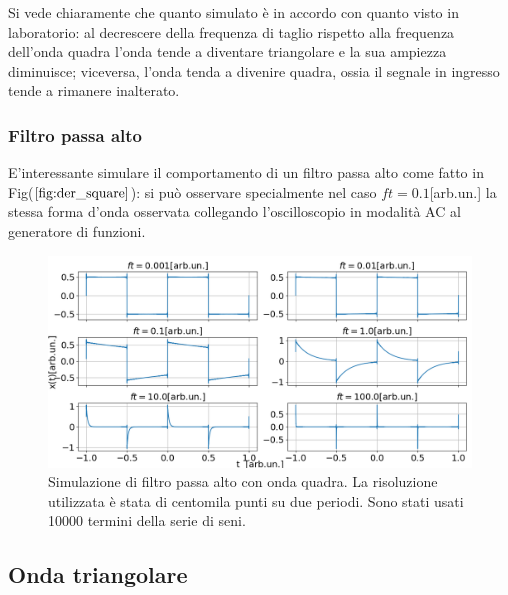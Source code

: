 \documentclass{article}
\begin{document}
                Si vede chiaramente che quanto simulato è in accordo con quanto
                visto in laboratorio: 
                al decrescere della frequenza di taglio rispetto alla frequenza dell'onda quadra
                l'onda tende a diventare triangolare e la sua ampiezza diminuisce; viceversa,
                l'onda tenda a divenire quadra, ossia il segnale in ingresso tende a 
                rimanere inalterato.
            
            
            \subsubsection{Filtro passa alto}
                E'interessante simulare il comportamento di un filtro passa alto 
                come fatto in Fig($\ref{fig:der_square}$): si  può osservare specialmente 
                nel caso $ft=0.1$[arb.un.] la stessa forma d'onda osservata collegando 
                l'oscilloscopio in modalità AC al generatore di funzioni.
                    \begin{figure}[H]
                        \centering
                        \includegraphics[width=1\textwidth]{der_square.png} %
                        \caption{Simulazione di filtro passa alto con onda quadra.
                        La risoluzione utilizzata è stata di centomila punti su due periodi.
                        Sono stati usati 10000 termini della serie di seni.}
                        \label{fig:der_square}
                    \end{figure}


    \subsection{Onda triangolare}
\end{document}
